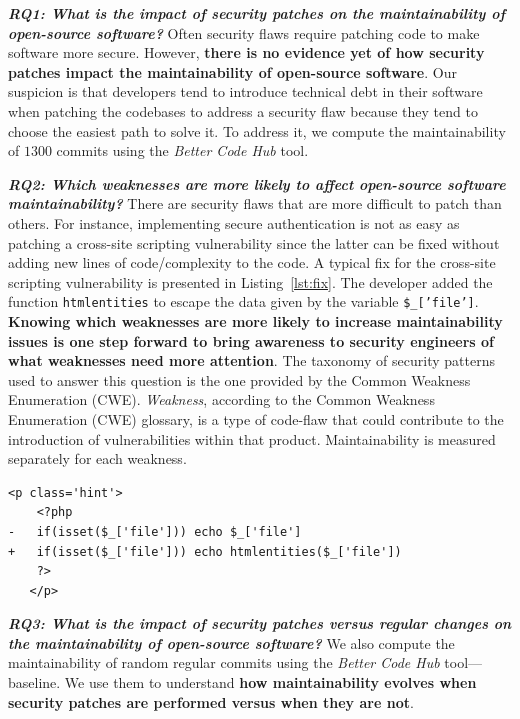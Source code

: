 \documentclass[smallextended]{svjour3}       %
\newcounter{lstannotation}
\begin{document}
\textit{\textbf{RQ1: What is the impact of security patches on the
maintainability of open-source software?}} Often security flaws 
require patching code to make software more secure. However, 
\textbf{there is no evidence yet of how security patches impact the
maintainability of open-source software}. Our suspicion is that 
developers tend to introduce technical debt in their software when 
patching the codebases to address a security flaw because they tend 
to choose the easiest path to solve it. To address it, we compute 
the maintainability of $1300$ commits using the \emph{Better Code Hub} tool. 

\textit{\textbf{RQ2: Which weaknesses are more likely to
affect open-source software maintainability?}} There are security 
flaws that are more difficult to patch than others. For instance, 
implementing secure authentication is not as easy as patching a
cross-site scripting vulnerability since the latter can be fixed
without adding new lines of code/complexity to the code. A typical 
fix for the cross-site scripting vulnerability is presented in 
Listing~\ref{lst:fix}. The developer added the function 
\texttt{htmlentities} to escape the data given by the variable
\texttt{\$\_['file']}. \textbf{Knowing which weaknesses are more 
likely to increase maintainability issues is one step forward to 
bring awareness to security engineers of what weaknesses need more 
attention}. The taxonomy of security patterns used to answer this 
question is the one provided by the Common Weakness Enumeration
(CWE). \emph{Weakness}, according to the Common Weakness Enumeration 
(CWE) glossary, is a type of code-flaw that could contribute to the 
introduction of vulnerabilities within that product. Maintainability 
is measured separately for each weakness.
%
\setcounter{lstannotation}{0}
\begin{lstlisting}[style={PHPStyle}, caption={Fix provided by \texttt{nextcloud/server} developers to a Cross-Site Scripting vulnerability},label={lst:fix}]
   <p class='hint'>
    <?php
-   if(isset($_['file'])) echo $_['file']
+   if(isset($_['file'])) echo htmlentities($_['file'])
    ?>
   </p>
\end{lstlisting}
%
\textit{\textbf{RQ3: What is the impact of security patches versus 
regular changes on the maintainability of open-source software?}}
%
We also compute the maintainability of random regular commits using 
the \emph{Better Code Hub} tool---baseline. We use them to 
understand \textbf{how maintainability evolves when security patches 
are performed versus when they are not}.
%
\end{document}
